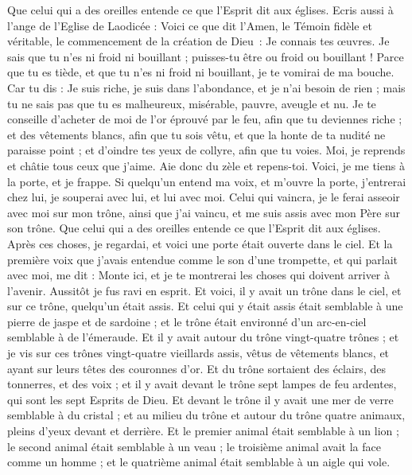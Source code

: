 \begin{multicols}{2}
Que celui qui a des oreilles entende ce que l'Esprit dit aux églises.
Ecris aussi à l'ange de l'Eglise de Laodicée : Voici ce que dit l'Amen, le Témoin fidèle et véritable, le commencement de la création de Dieu :
Je connais tes œuvres. Je sais que tu n'es ni froid ni bouillant ; puisses-tu être ou froid ou bouillant !
Parce que tu es tiède, et que tu n'es ni froid ni bouillant, je te vomirai de ma bouche.
Car tu dis : Je suis riche, je suis dans l'abondance, et je n'ai besoin de rien ; mais tu ne sais pas que tu es malheureux, misérable, pauvre, aveugle et nu.
Je te conseille d'acheter de moi de l'or éprouvé par le feu, afin que tu deviennes riche ; et des vêtements blancs, afin que tu sois vêtu, et que la honte de ta nudité ne paraisse point ; et d'oindre tes yeux de collyre, afin que tu voies.
Moi, je reprends et châtie tous ceux que j'aime. Aie donc du zèle et repens-toi.
Voici, je me tiens à la porte, et je frappe. Si quelqu'un entend ma voix, et m'ouvre la porte, j'entrerai chez lui, je souperai avec lui, et lui avec moi.
Celui qui vaincra, je le ferai asseoir avec moi sur mon trône, ainsi que j'ai vaincu, et me suis assis avec mon Père sur son trône.
Que celui qui a des oreilles entende ce que l'Esprit dit aux églises.
\VerseOne{}Après ces choses, je regardai, et voici une porte était ouverte dans le ciel. Et la première voix que j'avais entendue comme le son d'une trompette, et qui parlait avec moi, me dit : Monte ici, et je te montrerai les choses qui doivent arriver à l'avenir.
Aussitôt je fus ravi en esprit. Et voici, il y avait un trône dans le ciel, et sur ce trône, quelqu'un était assis.
Et celui qui y était assis était semblable à une pierre de jaspe et de sardoine ; et le trône était environné d’un arc-en-ciel semblable à de l’émeraude.
Et il y avait autour du trône vingt-quatre trônes ; et je vis sur ces trônes vingt-quatre vieillards assis, vêtus de vêtements blancs, et ayant sur leurs têtes des couronnes d'or.
Et du trône sortaient des éclairs, des tonnerres, et des voix ; et il y avait devant le trône sept lampes de feu ardentes, qui sont les sept Esprits de Dieu.
Et devant le trône il y avait une mer de verre semblable à du cristal ; et au milieu du trône et autour du trône quatre animaux, pleins d'yeux devant et derrière.
Et le premier animal était semblable à un lion ; le second animal était semblable à un veau ; le troisième animal avait la face comme un homme ; et le quatrième animal était semblable à un aigle qui vole.

\end{multicols}

